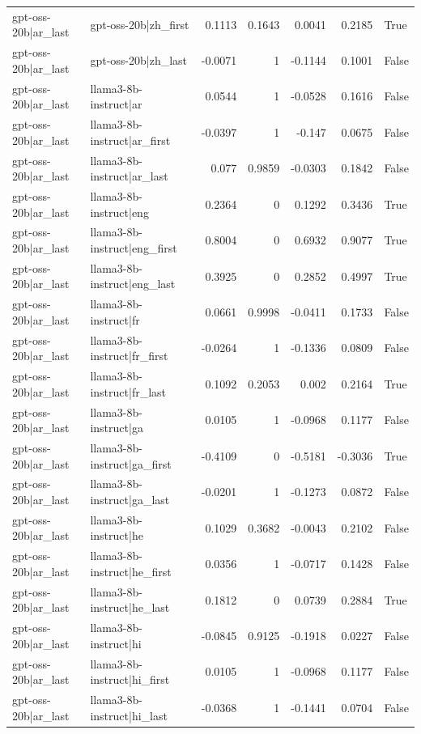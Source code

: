 \begin{table}
\begin{tabular}{l l r r r r l}
gpt-oss-20b|ar_last & gpt-oss-20b|zh_first & 0.1113 & 0.1643 & 0.0041 & 0.2185 & True \\
gpt-oss-20b|ar_last & gpt-oss-20b|zh_last & -0.0071 & 1 & -0.1144 & 0.1001 & False \\
gpt-oss-20b|ar_last & llama3-8b-instruct|ar & 0.0544 & 1 & -0.0528 & 0.1616 & False \\
gpt-oss-20b|ar_last & llama3-8b-instruct|ar_first & -0.0397 & 1 & -0.147 & 0.0675 & False \\
gpt-oss-20b|ar_last & llama3-8b-instruct|ar_last & 0.077 & 0.9859 & -0.0303 & 0.1842 & False \\
gpt-oss-20b|ar_last & llama3-8b-instruct|eng & 0.2364 & 0 & 0.1292 & 0.3436 & True \\
gpt-oss-20b|ar_last & llama3-8b-instruct|eng_first & 0.8004 & 0 & 0.6932 & 0.9077 & True \\
gpt-oss-20b|ar_last & llama3-8b-instruct|eng_last & 0.3925 & 0 & 0.2852 & 0.4997 & True \\
gpt-oss-20b|ar_last & llama3-8b-instruct|fr & 0.0661 & 0.9998 & -0.0411 & 0.1733 & False \\
gpt-oss-20b|ar_last & llama3-8b-instruct|fr_first & -0.0264 & 1 & -0.1336 & 0.0809 & False \\
gpt-oss-20b|ar_last & llama3-8b-instruct|fr_last & 0.1092 & 0.2053 & 0.002 & 0.2164 & True \\
gpt-oss-20b|ar_last & llama3-8b-instruct|ga & 0.0105 & 1 & -0.0968 & 0.1177 & False \\
gpt-oss-20b|ar_last & llama3-8b-instruct|ga_first & -0.4109 & 0 & -0.5181 & -0.3036 & True \\
gpt-oss-20b|ar_last & llama3-8b-instruct|ga_last & -0.0201 & 1 & -0.1273 & 0.0872 & False \\
gpt-oss-20b|ar_last & llama3-8b-instruct|he & 0.1029 & 0.3682 & -0.0043 & 0.2102 & False \\
gpt-oss-20b|ar_last & llama3-8b-instruct|he_first & 0.0356 & 1 & -0.0717 & 0.1428 & False \\
gpt-oss-20b|ar_last & llama3-8b-instruct|he_last & 0.1812 & 0 & 0.0739 & 0.2884 & True \\
gpt-oss-20b|ar_last & llama3-8b-instruct|hi & -0.0845 & 0.9125 & -0.1918 & 0.0227 & False \\
gpt-oss-20b|ar_last & llama3-8b-instruct|hi_first & 0.0105 & 1 & -0.0968 & 0.1177 & False \\
gpt-oss-20b|ar_last & llama3-8b-instruct|hi_last & -0.0368 & 1 & -0.1441 & 0.0704 & False \\

\end{tabular}
\end{table}
